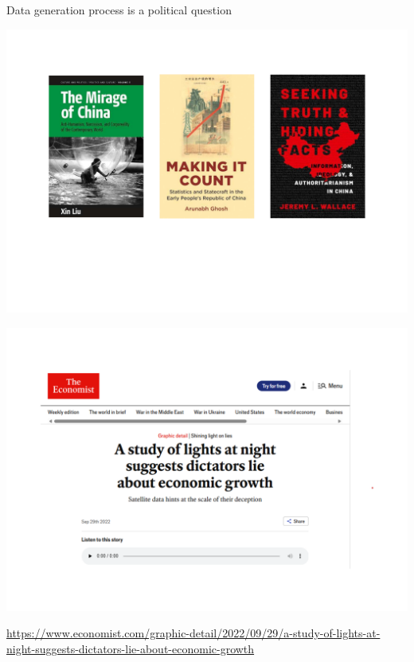 \documentclass[
  10pt,
  ignorenonframetext,
]{beamer}
\begin{document}
\begin{frame}{Data generation process is a political question}
\label{data-generation-process-is-a-political-question}
\begin{center}\includegraphics[width=1\linewidth]{Figs/books} \end{center}
\end{frame}

\begin{frame}
\begin{center}\includegraphics[width=0.7\linewidth]{Figs/economist} \end{center}
\vspace{0.2cm}
\begin{center}
\tiny
\url{https://www.economist.com/graphic-detail/2022/09/29/a-study-of-lights-at-night-suggests-dictators-lie-about-economic-growth}
\end{center}
\end{frame}
\end{document}
